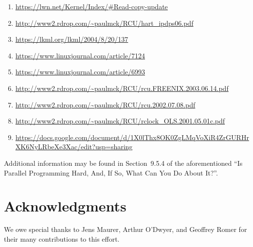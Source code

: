 \begin{enumerate}
\item	\url{https://lwn.net/Kernel/Index/#Read-copy-update}
\item	\url{http://www2.rdrop.com/~paulmck/RCU/hart_ipdps06.pdf}
\item	\url{https://lkml.org/lkml/2004/8/20/137}
\item	\url{https://www.linuxjournal.com/article/7124}
\item	\url{https://www.linuxjournal.com/article/6993}
\item	\url{http://www2.rdrop.com/~paulmck/RCU/rcu.FREENIX.2003.06.14.pdf}
\item	\url{http://www2.rdrop.com/~paulmck/RCU/rcu.2002.07.08.pdf}
\item	\url{http://www2.rdrop.com/~paulmck/RCU/rclock_OLS.2001.05.01c.pdf}
\item	\url{https://docs.google.com/document/d/1X0lThx8OK0ZgLMqVoXiR4ZrGURHrXK6NyLRbeXe3Xac/edit?usp=sharing}
\end{enumerate}

Additional information may be found in Section~9.5.4 of the aforementioned
``Is Parallel Programming Hard, And, If So, What Can You Do About It?''.

\section{Acknowledgments}
\label{sec:Acknowledgments}

We owe special thanks to Jens Maurer, Arthur O'Dwyer, and Geoffrey Romer
for their many contributions to this effort.
